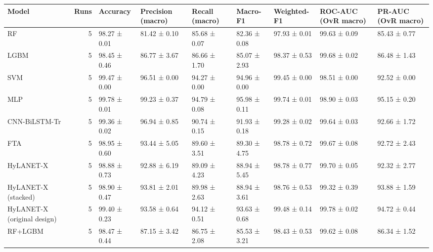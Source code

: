 \begin{tabular}{lrlllllll}
\toprule
Model & Runs & Accuracy & Precision (macro) & Recall (macro) & Macro-F1 & Weighted-F1 & ROC-AUC (OvR macro) & PR-AUC (OvR macro) \\
\midrule
RF & 5 & 98.27 ± 0.01 & 81.42 ± 0.10 & 85.68 ± 0.07 & 82.36 ± 0.08 & 97.93 ± 0.01 & 99.63 ± 0.09 & 85.43 ± 0.77 \\
LGBM & 5 & 98.45 ± 0.46 & 86.77 ± 3.67 & 86.66 ± 1.70 & 85.07 ± 2.93 & 98.37 ± 0.53 & 99.68 ± 0.02 & 86.48 ± 1.43 \\
SVM & 5 & 99.47 ± 0.00 & 96.51 ± 0.00 & 94.27 ± 0.00 & 94.96 ± 0.00 & 99.45 ± 0.00 & 98.51 ± 0.00 & 92.52 ± 0.00 \\
MLP & 5 & 99.78 ± 0.01 & 99.23 ± 0.37 & 94.79 ± 0.08 & 95.98 ± 0.11 & 99.74 ± 0.01 & 98.90 ± 0.03 & 95.15 ± 0.20 \\
CNN-BiLSTM-Tr & 5 & 99.36 ± 0.02 & 96.94 ± 0.85 & 90.74 ± 0.15 & 91.93 ± 0.18 & 99.28 ± 0.02 & 99.64 ± 0.03 & 92.66 ± 1.72 \\
FTA & 5 & 98.95 ± 0.60 & 93.44 ± 5.05 & 89.60 ± 3.51 & 89.30 ± 4.75 & 98.78 ± 0.72 & 99.67 ± 0.08 & 92.72 ± 2.43 \\
HyLANET-X & 5 & 98.88 ± 0.73 & 92.88 ± 6.19 & 89.09 ± 4.23 & 88.94 ± 5.45 & 98.78 ± 0.77 & 99.70 ± 0.05 & 92.32 ± 2.77 \\
HyLANET-X (stacked) & 5 & 98.90 ± 0.47 & 93.81 ± 2.01 & 89.98 ± 2.63 & 88.94 ± 3.61 & 98.76 ± 0.53 & 99.32 ± 0.39 & 93.88 ± 1.59 \\
HyLANET-X (original design) & 5 & 99.40 ± 0.23 & 93.58 ± 0.64 & 94.12 ± 0.51 & 93.63 ± 0.68 & 99.48 ± 0.14 & 99.78 ± 0.02 & 94.72 ± 0.44 \\
RF+LGBM & 5 & 98.47 ± 0.44 & 87.15 ± 3.42 & 86.75 ± 2.08 & 85.53 ± 3.21 & 98.43 ± 0.53 & 99.62 ± 0.08 & 86.34 ± 1.52 \\
\bottomrule
\end{tabular}
